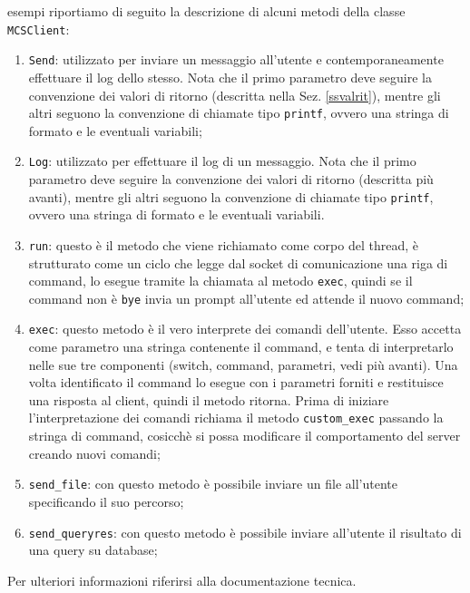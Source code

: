 esempi riportiamo di seguito la descrizione di alcuni metodi della
classe \verb|MCSClient|:
\begin{enumerate}
\item \verb|Send|: utilizzato per inviare un messaggio all'utente e
  contemporaneamente effettuare il log dello stesso. Nota che il primo
  parametro deve seguire la convenzione dei valori di ritorno
  (descritta nella Sez. \ref{ssvalrit}), mentre gli altri seguono la
  convenzione di chiamate tipo \verb|printf|, ovvero una stringa di
  formato e le eventuali variabili;
\item \verb|Log|: utilizzato per effettuare il log di un
  messaggio. Nota che il primo parametro deve seguire la convenzione
  dei valori di ritorno (descritta pi\`u avanti), mentre gli altri
  seguono la convenzione di chiamate tipo \verb|printf|, ovvero una
  stringa di formato e le eventuali variabili.
\item \verb|run|: questo \`e il metodo che viene richiamato come corpo
  del thread, \`e strutturato come un ciclo che legge dal socket di
  comunicazione una riga di command, lo esegue tramite la chiamata al
  metodo \verb|exec|, quindi se il command non \`e \verb|bye| invia un
  prompt all'utente ed attende il nuovo command;
\item \verb|exec|: questo metodo \`e il vero interprete dei comandi
  dell'utente. Esso accetta come parametro una stringa contenente il
  command, e tenta di interpretarlo nelle sue tre componenti (switch,
  command, parametri, vedi pi\`u avanti). Una volta identificato il
  command lo esegue con i parametri forniti e restituisce una risposta
  al client, quindi il metodo ritorna. Prima di iniziare
  l'interpretazione dei comandi richiama il metodo \verb|custom_exec|
  passando la stringa di command, cosicch\`e si possa modificare il
  comportamento del server creando nuovi comandi;
\item \verb|send_file|: con questo metodo \`e possibile inviare un
  file all'utente specificando il suo percorso;
\item \verb|send_queryres|: con questo metodo \`e possibile inviare
  all'utente il risultato di una query su database;
\end{enumerate}
%
Per ulteriori informazioni riferirsi alla documentazione tecnica.


